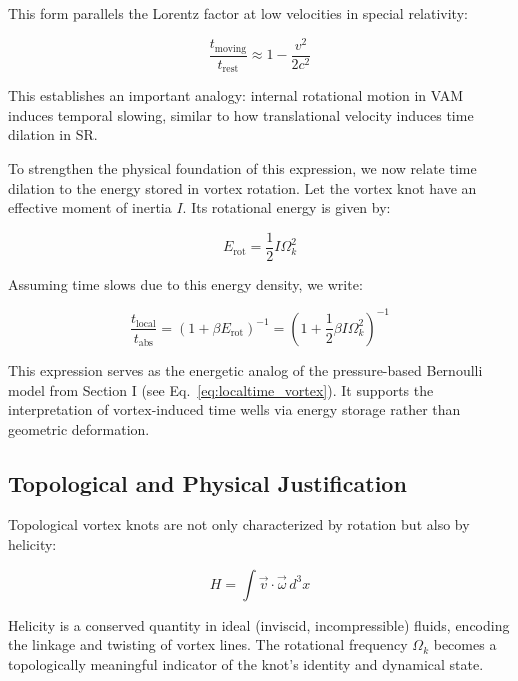 This form parallels the Lorentz factor at low velocities in special relativity:

\begin{equation}
\frac{t_{\text{moving}}}{t_{\text{rest}}} \approx 1 - \frac{v^2}{2c^2}\label{eq:parallels_lorentz_time_dilation}
\end{equation}

This establishes an important analogy: internal rotational motion in VAM induces temporal slowing, similar to how translational velocity induces time dilation in SR.

To strengthen the physical foundation of this expression, we now relate time dilation to the energy stored in vortex rotation. Let the vortex knot have an effective moment of inertia $I$. Its rotational energy is given by:

\begin{equation}
E_{\text{rot}} = \frac{1}{2} I \Omega_k^2\label{eq:rotational_energy_inertia}
\end{equation}

Assuming time slows due to this energy density, we write:

\begin{equation}
\frac{t_{\text{local}}}{t_{\text{abs}}} = \left(1 + \beta E_{\text{rot}} \right)^{-1} = \left(1 + \frac{1}{2} \beta I \Omega_k^2 \right)^{-1}\label{eq:time_dilation_rotational_energy_inertia}
\end{equation}

This expression serves as the energetic analog of the pressure-based Bernoulli model from Section I (see Eq.~\eqref{eq:localtime_vortex}). It supports the interpretation of vortex-induced time wells via energy storage rather than geometric deformation.

\subsection{Topological and Physical Justification}

Topological vortex knots are not only characterized by rotation but also by helicity:

\begin{equation}
H = \int \vec{v} \cdot \vec{\omega} \, d^3x \label{eq:helicity_rotation}
\end{equation}

Helicity is a conserved quantity in ideal (inviscid, incompressible) fluids, encoding the linkage and twisting of vortex lines. The rotational frequency $\Omega_k$ becomes a topologically meaningful indicator of the knot’s identity and dynamical state.

